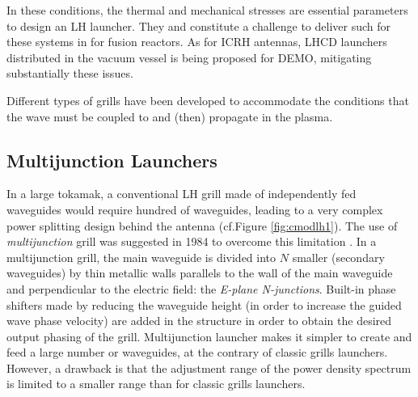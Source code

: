 In these conditions, the thermal and mechanical stresses are essential parameters to design an LH launcher. They and constitute a challenge to deliver such for these systems in for fusion reactors. As for ICRH antennas, LHCD launchers distributed in the vacuum vessel is being proposed for DEMO, mitigating substantially these issues.

Different types of grills have been developed to accommodate the conditions that the wave must be coupled to and (then) propagate in the plasma. 

%

\subsection{Multijunction Launchers}\label{sec:multijunction}
In a large tokamak, a conventional LH grill made of independently fed waveguides would require hundred of waveguides, leading to a very complex power splitting design behind the antenna (cf.Figure \ref{fig:cmodlh1}). The use of \emph{multijunction} grill was suggested in 1984 to overcome this limitation . In a multijunction grill, the main waveguide is divided into $N$ smaller (secondary waveguides) by thin metallic walls parallels to the wall of the main waveguide and perpendicular to the electric field: the \emph{E-plane N-junctions}. Built-in phase shifters made by reducing the waveguide height (in order to increase the guided wave phase velocity) are added in the structure in order to obtain the desired output phasing of the grill. Multijunction launcher makes it simpler to create and feed a large number or waveguides, at the contrary of classic grills launchers. However, a drawback is that the adjustment range of the power density spectrum is limited to a smaller range than for classic grills launchers.

